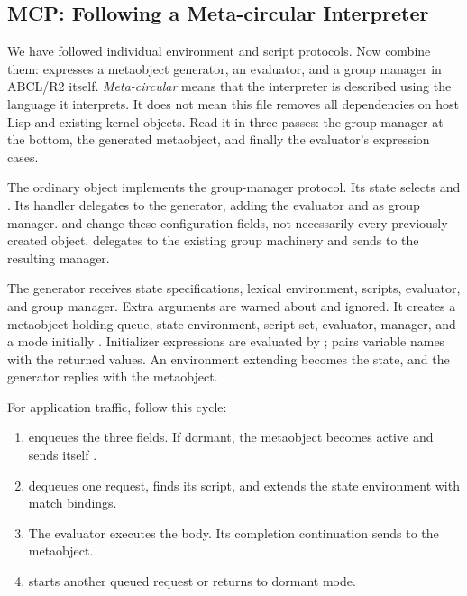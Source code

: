 \subsection{MCP: Following a Meta-circular Interpreter}
\label{sec:mcp-reading}

We have followed individual environment and script protocols. Now combine
them:  expresses a metaobject generator,
an evaluator, and a group manager in ABCL/R2 itself.
\emph{Meta-circular} means that the interpreter is described using
the language it interprets. It does not mean this file removes all
dependencies on host Lisp and existing kernel objects.
Read it in three passes: the group manager at the bottom, the generated
metaobject, and finally the evaluator's expression cases.

The ordinary object  implements the group-manager
protocol. Its state selects  and .
Its  handler delegates to the generator, adding the
evaluator and  as group manager.
 and  change these
configuration fields, not necessarily every previously created object.
 delegates to the existing group machinery and sends
 to the resulting manager.

The generator receives state specifications, lexical environment,
scripts, evaluator, and group manager. Extra arguments are warned about
and ignored. It creates a metaobject holding queue, state environment,
script set, evaluator, manager, and a mode initially .
Initializer expressions are evaluated by ;
 pairs variable names with the returned values.
An environment extending  becomes the state, and the
generator replies with the metaobject.

For application traffic, follow this cycle:


\begin{enumerate}
\item {} enqueues the three fields.
If dormant, the metaobject becomes active and sends itself .
\item {} dequeues one request, finds its script, and extends
the state environment with match bindings.
\item The evaluator executes the body. Its completion continuation sends
 to the metaobject.
\item {} starts another queued request or returns to dormant mode.
\end{enumerate}

